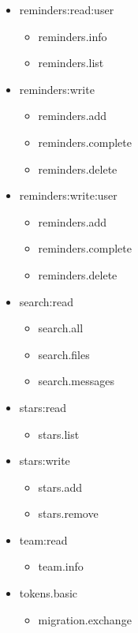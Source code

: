 \begin{multicols}{2}
\begin{itemize}
	\item reminders:read:user
	\begin{itemize}
		\item reminders.info
		\item reminders.list
	\end{itemize}
	
	\item reminders:write
	\begin{itemize}
		\item reminders.add
		\item reminders.complete
		\item reminders.delete
	\end{itemize}
	
	\item reminders:write:user
	\begin{itemize}
		\item reminders.add
		\item reminders.complete
		\item reminders.delete
	\end{itemize}
	
	\item search:read
	\begin{itemize}
		\item search.all
		\item search.files
		\item search.messages
	\end{itemize}
	
	\item stars:read
	\begin{itemize}
		\item stars.list
	\end{itemize}
	
	\item stars:write
	\begin{itemize}
		\item stars.add
		\item stars.remove
	\end{itemize}
	
	\item team:read
	\begin{itemize}
		\item team.info
	\end{itemize}
	
	\item tokens.basic
	\begin{itemize}
		\item migration.exchange
	\end{itemize}
	

\end{itemize}
\end{multicols}
